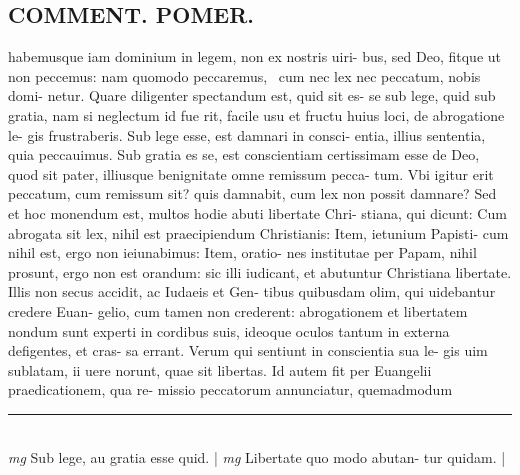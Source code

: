 \documentclass{article}
\begin{document}
\begin{pages}
\section*{COMMENT. POMER.  }\pstart habemusque iam dominium in legem, non ex nostris uiri- bus, sed Deo, fitque ut non peccemus: nam quomodo peccaremus,  cum nec lex nec peccatum, nobis domi- netur. Quare diligenter spectandum est, quid sit es- se sub lege, quid sub gratia, nam si neglectum id fue rit, facile usu et fructu huius loci, de abrogatione le- gis frustraberis. Sub lege esse, est damnari in consci- entia, illius sententia, quia peccauimus. Sub gratia es se, est conscientiam certissimam esse de Deo, quod sit pater, illiusque benignitate omne remissum pecca- tum. Vbi igitur erit peccatum, cum remissum sit? quis damnabit, cum lex non possit damnare? Sed et hoc monendum est, multos hodie abuti libertate Chri- stiana, qui dicunt: Cum abrogata sit lex, nihil est praecipiendum Christianis: Item, ietunium Papisti- cum nihil est, ergo non ieiunabimus: Item, oratio- nes institutae per Papam, nihil prosunt, ergo non est orandum: sic illi iudicant, et abutuntur Christiana libertate. Illis non secus accidit, ac Iudaeis et Gen- tibus quibusdam olim, qui uidebantur credere Euan- gelio, cum tamen non crederent: abrogationem et libertatem nondum sunt experti in cordibus suis, ideoque oculos tantum in externa defigentes, et cras- sa errant. Verum qui sentiunt in conscientia sua le- gis uim sublatam, ii uere norunt, quae sit libertas.  Id autem fit per Euangelii praedicationem, qua re- missio peccatorum annunciatur, quemadmodum  \pend
\vspace{0.5cm}\noindent
\vspace{0.2cm}\rule{1cm}{0.2pt}\\ 
\hspace{0.2cm}\textit{mg}
\footnotesize Sub lege, au gratia esse quid.  
\normalsize| 
\hspace{0.2cm}\textit{mg}
\footnotesize Libertate quo modo abutan- tur quidam.  
\normalsize| 

\end{pages}
\end{document}
